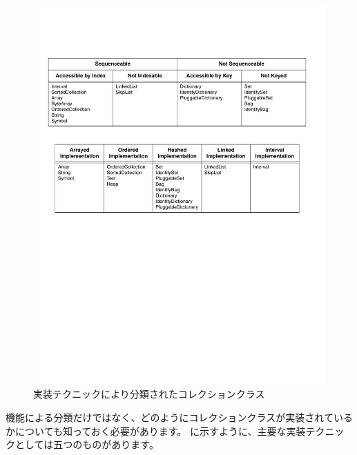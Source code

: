 \documentclass[a4paper,10pt,twoside]{book}
\begin{document}
\begin{figure}
\begin{center}
\includegraphics[width=\textwidth]{CollectionsByImpl}
\caption{実装テクニックにより分類されたコレクションクラス%
    }
\end{center}
\end{figure}

機能による分類だけではなく、どのようにコレクションクラスが実装されているかについても知っておく必要があります。 に示すように、主要な実装テクニックとしては五つのものがあります。
\end{document}
